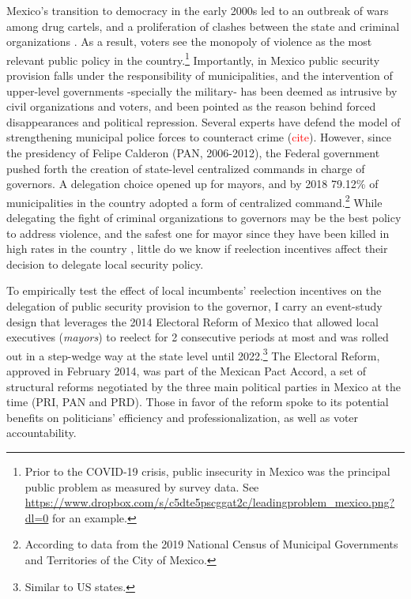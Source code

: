 \documentclass[12pt]{amsart}
\numberwithin{equation}{section}
\theoremstyle{definition}
\theoremstyle{definition}
\theoremstyle{definition}
\begin{document}
Mexico's transition to democracy in the early 2000s led to an outbreak of wars among drug cartels, and a proliferation of clashes between the state and criminal organizations \citep{ley_trejo_2020}. As a result, voters see the monopoly of violence as the most relevant public policy in the country.\footnote{Prior to the COVID-19 crisis, public insecurity in Mexico was the principal public problem as measured by survey data. See \url{https://www.dropbox.com/s/c5dte5pscggat2c/leadingproblem_mexico.png?dl=0} for an example.} Importantly, in Mexico public security provision falls under the responsibility of municipalities, and the intervention of upper-level governments -specially the military- has been deemed as intrusive by civil organizations and voters, and been pointed as the reason behind forced disappearances and political repression. Several experts have defend the model of strengthening municipal police forces to counteract crime (\textcolor{red}{cite}). However, since the presidency of Felipe Calderon (PAN, 2006-2012), the Federal government pushed forth the creation of state-level centralized commands in charge of governors. A delegation choice opened up for mayors, and by 2018 79.12\% of municipalities in the country adopted a form of centralized command.\footnote{According to data from the 2019 National Census of Municipal Governments and Territories of the City of Mexico.} While delegating the fight of criminal organizations to governors may be the best policy to address violence, and the safest one for mayor since they have been killed in high rates in the country \citep{ley_trejo_2020}, little do we know if reelection incentives affect their decision to delegate local security policy. %


   To empirically test the effect of local incumbents' reelection incentives on the delegation of public security provision to the governor, I carry an event-study design that leverages the 2014 Electoral Reform of Mexico that allowed local executives (\emph{mayors}) to reelect for 2 consecutive periods at most and was rolled out in a step-wedge way at the state level until 2022.\footnote{Similar to US states.} The Electoral Reform, approved in February 2014, was part of the Mexican Pact Accord, a set of structural reforms negotiated by the three main political parties in Mexico at the time (PRI, PAN and PRD). Those in favor of the reform spoke to its potential benefits on politicians' efficiency and professionalization, as well as voter accountability. %
     
\end{document}
